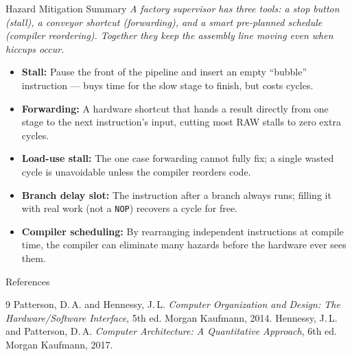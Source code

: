 \documentclass{beamer}
\begin{document}
\begin{frame}{Hazard Mitigation Summary}
  \textit{A factory supervisor has three tools: a stop button (stall), a
  conveyor shortcut (forwarding), and a smart pre-planned schedule (compiler
  reordering). Together they keep the assembly line moving even when hiccups
  occur.}

  \medskip
  \begin{itemize}
    \item \textbf{Stall:} Pause the front of the pipeline and insert an empty
          ``bubble'' instruction --- buys time for the slow stage to finish,
          but costs cycles.
    \item \textbf{Forwarding:} A hardware shortcut that hands a result directly
          from one stage to the next instruction's input, cutting most RAW stalls
          to zero extra cycles.
    \item \textbf{Load-use stall:} The one case forwarding cannot fully fix; a
          single wasted cycle is unavoidable unless the compiler reorders code.
    \item \textbf{Branch delay slot:} The instruction after a branch always
          runs; filling it with real work (not a \texttt{NOP}) recovers a cycle
          for free.
    \item \textbf{Compiler scheduling:} By rearranging independent instructions
          at compile time, the compiler can eliminate many hazards before the
          hardware ever sees them.
  \end{itemize}
\end{frame}

\begin{frame}{References}
  \begin{thebibliography}{9}
     Patterson, D.\,A. and Hennessy, J.\,L.
      \textit{Computer Organization and Design: The Hardware/Software Interface},
      5th ed. Morgan Kaufmann, 2014.
     Hennessy, J.\,L. and Patterson, D.\,A.
      \textit{Computer Architecture: A Quantitative Approach},
      6th ed. Morgan Kaufmann, 2017.
  \end{thebibliography}
\end{frame}
\end{document}
